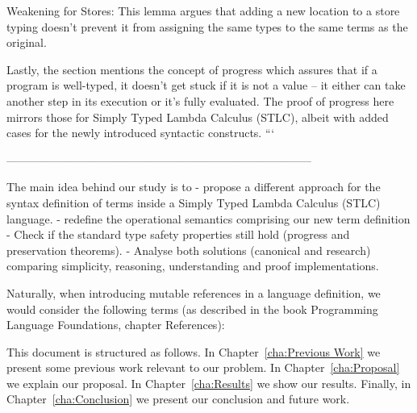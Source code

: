     Weakening for Stores: This lemma argues that adding a new location to a store typing doesn't prevent it from assigning the same types to the same terms as the original.

Lastly, the section mentions the concept of progress which assures that if a program is well-typed, it doesn't get stuck if it is not a value – it either can take another step in its execution or it's fully evaluated. The proof of progress here mirrors those for Simply Typed Lambda Calculus (STLC), albeit with added cases for the newly introduced syntactic constructs.
```

---------------------------------------------------------------------------------


The main idea behind our study is to
    - propose a different approach for the syntax definition of terms inside a Simply Typed Lambda Calculus (STLC) language.
    - redefine the operational semantics comprising our new term definition
    - Check if the standard type safety properties still hold (progress and preservation theorems).
    - Analyse both solutions (canonical and research) comparing simplicity, reasoning, understanding and proof implementations.


Naturally, when introducing mutable references in a language definition, we would consider the following terms (as described in the book Programming Language Foundations, chapter References):




This document is structured as follows. In Chapter~\ref{cha:Previous Work} we present some previous work relevant to our problem. In Chapter~\ref{cha:Proposal} we explain our proposal. In Chapter~\ref{cha:Results} we show our results. Finally, in Chapter~\ref{cha:Conclusion} we present our conclusion and future work.


